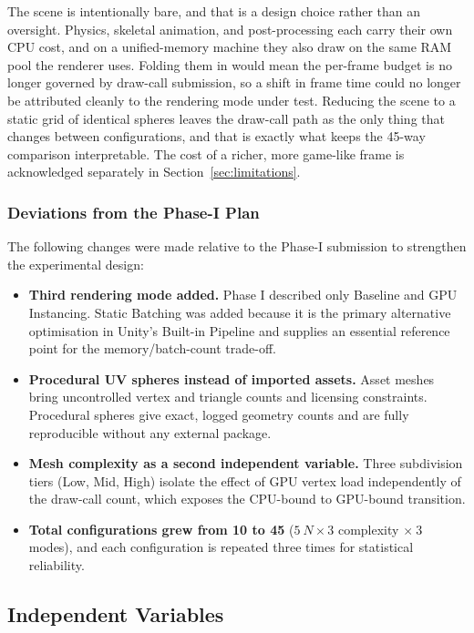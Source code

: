 \documentclass[11pt,a4paper]{article}
\begin{document}
The scene is intentionally bare, and that is a design choice rather than an oversight.
Physics, skeletal animation, and post-processing each carry their own CPU cost, and on a
unified-memory machine they also draw on the same RAM pool the renderer uses. Folding
them in would mean the per-frame budget is no longer governed by draw-call submission,
so a shift in frame time could no longer be attributed cleanly to the rendering mode
under test. Reducing the scene to a static grid of identical spheres leaves the
draw-call path as the only thing that changes between configurations, and that is
exactly what keeps the 45-way comparison interpretable. The cost of a richer, more
game-like frame is acknowledged separately in Section~\ref{sec:limitations}.

\subsubsection{Deviations from the Phase-I Plan}

The following changes were made relative to the Phase-I submission to strengthen the
experimental design:

\begin{itemize}
  \item \textbf{Third rendering mode added.} Phase I described only Baseline and GPU
        Instancing. Static Batching was added because it is the primary alternative
        optimisation in Unity's Built-in Pipeline and supplies an essential reference
        point for the memory/batch-count trade-off.
  \item \textbf{Procedural UV spheres instead of imported assets.} Asset meshes bring
        uncontrolled vertex and triangle counts and licensing constraints. Procedural
        spheres give exact, logged geometry counts and are fully reproducible without
        any external package.
  \item \textbf{Mesh complexity as a second independent variable.} Three subdivision
        tiers (Low, Mid, High) isolate the effect of GPU vertex load independently of
        the draw-call count, which exposes the CPU-bound to GPU-bound transition.
  \item \textbf{Total configurations grew from 10 to 45} ($5\ N \times 3$ complexity
        $\times\ 3$ modes), and each configuration is repeated three times for
        statistical reliability.
\end{itemize}

\subsection{Independent Variables}
\end{document}
